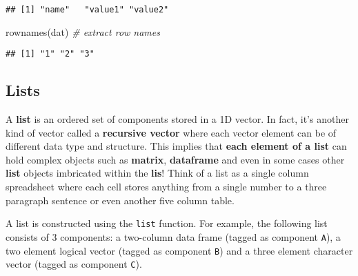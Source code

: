 \documentclass[
]{article}
\newenvironment{Shaded}{\begin{snugshade}}{\end{snugshade}}
\newcommand{\CommentTok}[1]{\textcolor[rgb]{0.56,0.35,0.01}{\textit{#1}}}
\newcommand{\FunctionTok}[1]{\textcolor[rgb]{0.00,0.00,0.00}{#1}}
\newcommand{\NormalTok}[1]{#1}
\begin{document}
\begin{verbatim}
## [1] "name"   "value1" "value2"
\end{verbatim}

\begin{Shaded}
\begin{Highlighting}[]
\FunctionTok{rownames}\NormalTok{(dat) }\CommentTok{\# extract row names}
\end{Highlighting}
\end{Shaded}

\begin{verbatim}
## [1] "1" "2" "3"
\end{verbatim}

\hypertarget{lists}{%
\subsection{Lists}\label{lists}}

A \textbf{list} is an ordered set of components stored in a 1D vector.
In fact, it's another kind of vector called a \textbf{recursive vector}
where each vector element can be of different data type and structure.
This implies that \textbf{each element of a list} can hold complex
objects such as \textbf{matrix}, \textbf{dataframe} and even in some
cases other \textbf{list} objects imbricated within the \textbf{lis}!
Think of a list as a single column spreadsheet where each cell stores
anything from a single number to a three paragraph sentence or even
another five column table.

A list is constructed using the \texttt{list} function. For example, the
following list consists of 3 components: a two-column data frame (tagged
as component \texttt{A}), a two element logical vector (tagged as
component \texttt{B}) and a three element character vector (tagged as
component \texttt{C}).
\end{document}
